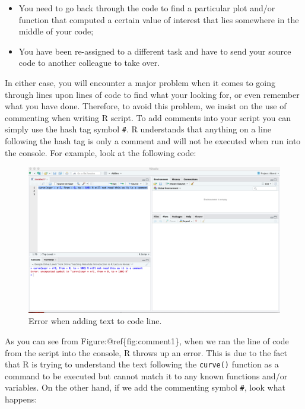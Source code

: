\documentclass[
]{book}
\providecommand{\tightlist}{%
  \setlength{\itemsep}{0pt}\setlength{\parskip}{0pt}}
\theoremstyle{definition}
\theoremstyle{definition}
\theoremstyle{definition}
\theoremstyle{definition}
\theoremstyle{remark}
\begin{document}
\begin{itemize}
\tightlist
\item
  You need to go back through the code to find a particular plot and/or function that computed a certain value of interest that lies somewhere in the middle of your code;
\item
  You have been re-assigned to a different task and have to send your source code to another colleague to take over.
\end{itemize}

In either case, you will encounter a major problem when it comes to going through lines upon lines of code to find what your looking for, or even remember what you have done. Therefore, to avoid this problem, we insist on the use of commenting when writing R script. To add comments into your script you can simply use the hash tag symbol \texttt{\#}. R understands that anything on a line following the hash tag is only a comment and will not be executed when run into the console. For example, look at the following code:

\begin{figure}

{\centering \includegraphics[width=0.7\linewidth]{Figures/commenting2} 

}

\caption{Error when adding text to code line.}\label{fig:comment1}
\end{figure}

As you can see from Figure:@ref\{fig:comment1\}, when we ran the line of code from the script into the console, R throws up an error. This is due to the fact that R is trying to understand the text following the \texttt{curve()} function as a command to be executed but cannot match it to any known functions and/or variables. On the other hand, if we add the commenting symbol \texttt{\#}, look what happens:
\end{document}
